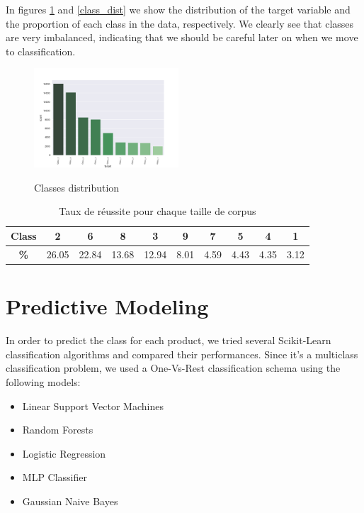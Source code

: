 \documentclass[a4paper,english,12pt, twocolumn]{article}
\begin{document}
In figures \ref{target} and \ref{class_dist} we show the distribution of the target variable and the proportion of each class in the data, respectively.  We clearly see that classes are very imbalanced, indicating that we should be careful later on when we move to classification.

\begin{figure}[H]
	\centering
		\centering
		\includegraphics[width=0.48\textwidth]{target}
		\label{target}
	\caption{Classes distribution}
\end{figure}

\begin{table}[H]\centering
	\begin{tabular}{cccccccccc}
		\toprule \textbf{Class} & 2 & 6 & 8 & 3 & 9 & 7 & 5 & 4 & 1\\    \midrule
		\textbf{\%} & 26.05 & 22.84 & 13.68 & 12.94 & 8.01 &  4.59 & 4.43 &  4.35 & 3.12 \\   
		\bottomrule	
	\end{tabular}
	\caption{Taux de réussite pour chaque taille de corpus\label{tab1}}
\end{table}


\section{Predictive Modeling}

In order to predict the class for each product, we tried several Scikit-Learn classification algorithms and compared their performances. Since it's a multiclass classification problem, we used a One-Vs-Rest classification schema  using the following models:
\begin{itemize}
	\item Linear Support Vector Machines
	\item Random Forests
	\item Logistic Regression
	\item MLP Classifier
	\item Gaussian Naive Bayes
\end{itemize}
\end{document}
